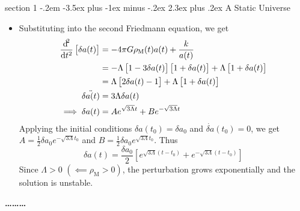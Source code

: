 \documentclass[12pt]{article}
\makeatletter
\newenvironment{problem}{\@startsection
	{section}
	{1}
	{-.2em}
	{-3.5ex plus -1ex minus -.2ex}
	{2.3ex plus .2ex}
	{\pagebreak[3]%
		\large\bf\noindent{Problem }
	}
}
{%
	\begin{center}\large\bf \ldots\ldots\ldots\end{center}}
\makeatother
\begin{document}
\begin{problem}{A Static Universe}
\begin{itemize}
			\item Substituting into the second Friedmann equation, we get \begin{align*}
				\frac{\dif^2}{\dif t^2} \left[\delta a(t)\right] &= -4\pi G \rho_\mathrm{M}(t) a(t) + \frac{k}{a(t) }
				\\
				&= -\Lambda \left[ 1 - 3\delta a(t) \right] \left[ 1 + \delta a(t) \right] + \Lambda  \left[ 1 + \delta a(t) \right] 
				\\
				&= \Lambda \left[ 2\delta a(t) - 1 \right] + \Lambda  \left[ 1 + \delta a(t) \right] 
				\\
				\ddot{\delta a(t)} &= 3 \Lambda \delta a(t)
				\\
				\implies \delta a(t) &= A e^{\sqrt{3\Lambda} t} + B e^{-\sqrt{3\Lambda} t}
			\end{align*}  Applying the initial conditions $\delta a(t_0) = \delta a_0$ and $\dot{\delta a}(t_0) = 0$, we get $A = \frac{1}{2}\delta a_0 e^{-\sqrt{3\Lambda} t_0}$ and $B = \frac{1}{2}\delta a_0 e^{\sqrt{3\Lambda} t_0}$.  Thus \begin{equation*}
				\delta a(t) =  \frac{\delta a_0}{2}  \left[e^{\sqrt{3\Lambda} (t-t_0)} + e^{-\sqrt{3\Lambda} (t-t_0)}\right]
			\end{equation*} Since $\Lambda>0$ $(\impliedby \rho_\mathrm{M}>0)$, the perturbation grows exponentially and the solution is unstable.
		\end{itemize}
		
	\end{problem}
	
\end{document}
